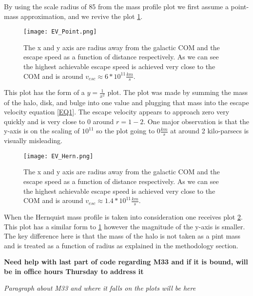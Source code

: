 \documentclass[fleqn,usenatbib]{mnras}
\begin{document}
By using the scale radius of 85 from the mass profile plot we first assume a point-mass approximation, and we revive the plot \ref{fig:fig 4}.
\begin{figure}
	\texttt{[image: EV\_Point.png]}
    \caption{The x and y axis are radius away from the galactic COM and the escape speed as a function of distance respectively. As we can see the highest achievable escape speed is achieved very close to the COM and is around $v_{esc}\approx 6*10^{11} \frac{km}{s}$.}
    \label{fig:fig 4}
\end{figure}
This plot has the form of a $y=\frac{1}{x^{2}}$ plot. The plot was made by summing the mass of the halo, disk, and bulge into one value and plugging that mass into the escape velocity equation \ref{EQ1}. The escape velocity appears to approach zero very quickly and is very close to 0 around $r=1-2$. One major observation is that the y-axis is on the scaling of $10^{11}$ so the plot going to $0\frac{km}{s}$ at around 2 kilo-parsecs is visually misleading. 

\begin{figure}
	\texttt{[image: EV\_Hern.png]}
    \caption{The x and y axis are radius away from the galactic COM and the escape speed as a function of distance respectively. As we can see the highest achievable escape speed is achieved very close to the COM and is around $v_{esc}\approx 1.4*10^{11} \frac{km}{s}$.}
    \label{fig:fig 5}
\end{figure}
When the Hernquist mass profile is taken into consideration one receives plot \ref{fig:fig 5}. This plot has a similar form to \ref{fig:fig 4} however the magnitude of the y-axis is smaller. The key difference here is that the mass of the halo is not taken as a pint mass and is treated as a function of radius as explained in the methodology section. 

\textbf{Need help with last part of code regarding M33 and if it is bound, will be in office hours Thursday to address it}

\textit{Paragraph about M33 and where it falls on the plots will be here}
\end{document}
